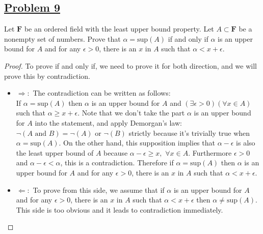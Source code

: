 \documentclass[10pt,letterpaper]{article}
\begin{document}
	\subsection*{{\color{purple}\underline{Problem 9}}}
	Let $\mathbf{F}$ be an ordered field with the least upper bound property. Let $A \subset \mathbf{F}$ be a
	nonempty set of numbers. Prove that $\alpha = \mathrm{sup}(A)$ if and only if $\alpha$ is an upper bound for $A$
	and for any $\epsilon > 0$, there is an $x$ in $A$ such that $\alpha < x + \epsilon$. 
	\begin{proof} To prove if and only if, we need to prove it for both direction, and we will
		prove this by contradiction.
		\begin{itemize}
			\item $\Rightarrow:$ The contradiction can be written as follows: \\ 
			If $\alpha = \mathrm{sup}(A)$ then $\alpha$ is an upper bound for $A$
			and $(\exists \epsilon > 0)(\forall x \in A)$ such that $\alpha \geq x + \epsilon$.
			Note that we don't take the part $\alpha$ is an upper bound for $A$ into the statement, and 
			apply Demorgan's law: $\neg(A \text{ and } B) = \neg(A) \text{ or } \neg(B)$ strictly because
			it's trivially true when $\alpha = \mathrm{sup}(A)$. On the other hand, this supposition implies
			that $\alpha - \epsilon$ is also the least upper bound of $A$ because $\alpha - \epsilon \geq x, \, \, \forall x \in A$. Furthermore $\epsilon > 0$ and
			$\alpha - \epsilon < \alpha$, this is a contradiction. Therefore if $\alpha = \mathrm{sup}(A)$ then 
			$\alpha$ is an upper bound for $A$ and for any $\epsilon > 0$, there is an $x$ in $A$ 
			such that $\alpha < x + \epsilon$.
			
			\item $\Leftarrow:$ To prove from this side, we assume that if $\alpha$ is an upper bound for $A$
			and for any $\epsilon > 0$, there is an $x$ in $A$ such that $\alpha < x + \epsilon$ then $\alpha \neq
			\mathrm{sup}(A)$.
			This side is too obvious and it leads to contradiction immediately.  
		\end{itemize}
	\end{proof}

\end{document}
